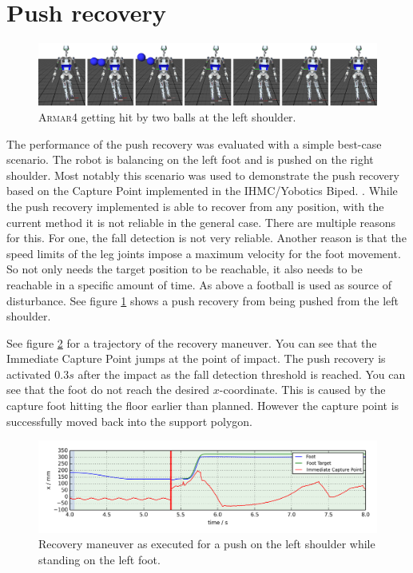 \documentclass[english,ngerman]{KITreprt}
\newcommand{\name}[1]{\textsc{#1}}
\begin{document}
\section{Push recovery}\label{push-recovery-1}

\begin{figure}[hbt]
\vspace*{-1em}
\includegraphics[width=\textwidth,resolution=300]{images/push_recovery_thumbs.png}
\caption{\name{Armar4} getting hit by two balls at the left shoulder.}
\label{img:push-recovery-thumbs}
\end{figure}

The performance of the push recovery was evaluated with a simple
best-case scenario. The robot is balancing on the left foot and is
pushed on the right shoulder. Most notably this scenario was used to
demonstrate the push recovery based on the Capture Point implemented in
the IHMC/Yobotics Biped. \cite{pratt2009video}. While the push recovery
implemented is able to recover from any position, with the current
method it is not reliable in the general case. There are multiple
reasons for this. For one, the fall detection is not very reliable.
Another reason is that the speed limits of the leg joints impose a
maximum velocity for the foot movement. So not only needs the target
position to be reachable, it also needs to be reachable in a specific
amount of time. As above a football is used as source of disturbance.
See figure \ref{img:push-recovery-thumbs} shows a push recovery from
being pushed from the left shoulder.

See figure \ref{img:push-recovery-x} for a trajectory of the recovery
maneuver. You can see that the Immediate Capture Point jumps at the
point of impact. The push recovery is activated $0.3s$ after the impact
as the fall detection threshold is reached. You can see that the foot do
not reach the desired $x$-coordinate. This is caused by the capture foot
hitting the floor earlier than planned. However the capture point is
successfully moved back into the support polygon.

\begin{figure}[hbt]
\vspace*{-1em}
\includegraphics[width=\textwidth,resolution=300]{images/push_recovery_x.png}
\caption{Recovery maneuver as executed for a push on the left shoulder while standing on the left foot.}
\label{img:push-recovery-x}
\end{figure}
\end{document}
